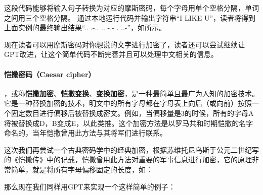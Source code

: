 这段代码能够将输入句子转换为对应的摩斯密码，每个字母用单个空格分隔，单词之间用三个空格分隔。
通过本地运行代码并输出字符串``I LIKE U''，读者将得到上面实例的最终输出结果``.. .-.. .. -.- . ..-''，如所示。


现在读者可以用摩斯密码对你想说的文字进行加密了，读者还可以尝试继续让GPT改进，让这个简单代码不断完善并且可以处理中文相关的信息。

\paragraph{恺撒密码（Caesar cipher）}，或称\textbf{恺撒加密}、\textbf{恺撒变换}、\textbf{变换加密}，是一种最简单且最广为人知的加密技术。它是一种替换加密的技术，明文中的所有字母都在字母表上向后（或向前）按照一个固定数目进行偏移后被替换成密文。例如，当偏移量是3的时候，所有的字母A将被替换成D，B变成E，以此类推。这个加密方法是以罗马共和时期恺撒的名字命名的，当年恺撒曾用此方法与其将军们进行联系。

这次我们再尝试一个古典密码学中的经典加密，根据苏维托尼乌斯于公元二世纪写的《恺撒传》中的记载，恺撒曾用此方法对重要的军事信息进行加密，它的原理非常简单，就是将所有字母偏移固定的长度，如：


那么现在我们同样用GPT来实现一个这样简单的例子：



